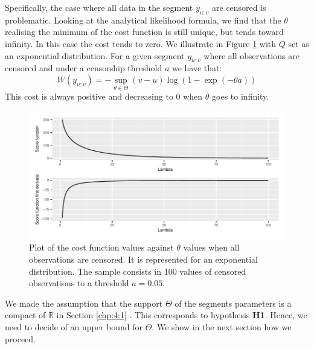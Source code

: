 Specifically, the case where all data in the segment $y_{u:v}$ are censored is problematic. Looking at the analytical likelihood formula, we find that the $\theta$ realising the minimum of the cost function is still unique, but tends toward infinity. In this case the cost tends to zero. We illustrate in Figure \ref{fig:onlycens} with $Q$ set as an exponential distribution. 
For a given segment $y_{u:v}$ where all observations are censored and under a censorship threshold $a$ we have that: 
\begin{equation} \label{chp:4:costex}
W(y_{u:v}) = -\sup_{\theta \in \Theta}(v-u)\log(1-\exp(-\theta a)) 
\end{equation}
This cost is always positive and decreasing to 0 when $\theta$  goes to infinity. 
\begin{figure}[ht]
    \centering
    \includegraphics{figs/Chap4/only_cens.pdf}
    \caption{Plot of the cost function values against $\theta$ values when all observations are censored. It is represented for an exponential distribution. The sample consists in 100 values of censored observations to a threshold $a = 0.05$.}
    \label{fig:onlycens}
\end{figure}

We made the assumption that the support $\Theta$ of the segments parameters is a compact of $\mathbb{R}$ in Section \ref{chp:4:1} . This corresponds to hypothesis \textbf{H1}. Hence, we need to decide of an upper bound for $\Theta$. We show in the next section how we proceed. 


